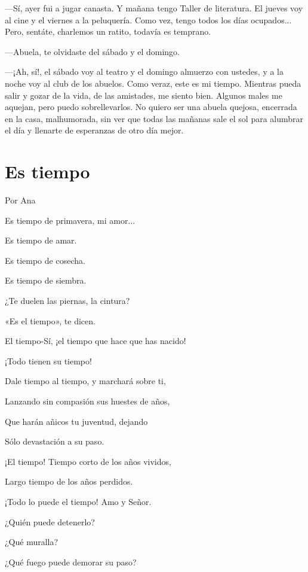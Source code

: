 \documentclass[11pt,twoside,openright,a5paper]{book}
\begin{document}
---Sí, ayer fui a jugar canasta. Y mañana tengo Taller de literatura. El jueves voy al cine y el viernes a la peluquería. Como vez, tengo todos los días ocupados... Pero, sentáte, charlemos un ratito, todavía es temprano.

---Abuela, te olvidaste del sábado y el domingo.

---¡Ah, sí!, el sábado voy al teatro y el domingo almuerzo con ustedes, y a la noche voy al club de los abuelos. Como veraz, este es mi tiempo. Mientras pueda salir y gozar de la vida, de las amistades, me siento bien. Algunos males me aquejan, pero puedo sobrellevarlos. No quiero ser una abuela quejosa, encerrada en la casa, malhumorada, sin ver que todas las mañanas sale el sol para alumbrar el día y llenarte de esperanzas de otro día mejor.

\section*{Es tiempo}

                                                                                                        \begin{flushright}Por Ana\end{flushright}

Es tiempo de primavera, mi amor...

Es tiempo de amar.

Es tiempo de cosecha.

Es tiempo de siembra.

¿Te duelen las piernas, la cintura?

«Es el tiempo», te dicen.

El tiempo-Sí, ¡el tiempo que hace que has nacido!

¡Todo tienen su tiempo!

Dale tiempo al tiempo, y marchará sobre ti, 

Lanzando sin compasión sus huestes de años,

Que harán añicos tu juventud, dejando

Sólo devastación a su paso.

¡El tiempo! Tiempo corto de los años vividos,

Largo tiempo de los años perdidos.

¡Todo lo puede el tiempo! Amo y Señor.

¿Quién puede detenerlo?

¿Qué muralla?

¿Qué fuego puede demorar su paso?
\end{document}
